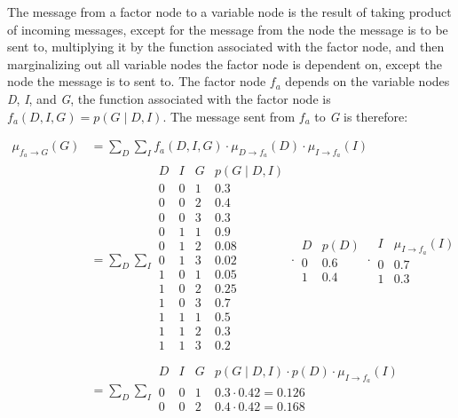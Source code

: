 \documentclass[a4paper, 12pt]{article}
\begin{document}
The message from a factor node to a variable node is the result of taking product of incoming messages, except for the message from the node the message is to be sent to, multiplying it by the function associated with the factor node, and then marginalizing out all variable nodes the factor node is dependent on, except the node the message is to sent to. The factor node $f_a$ depends on the variable nodes \textit{D}, \textit{I}, and \textit{G}, the function associated with the factor node is $f_a(D, I, G) = p(G \mid D, I)$. The message sent from $f_a$ to \textit{G} is therefore:

\begin{align}
	\mu_{f_a \to G}(G) &= \sum_D \sum_I f_a(D, I, G) \cdot \mu_{D \to f_a}(D) \cdot \mu_{I \to f_a}(I)\\
	&= \sum_D \sum_I \begin{array}{ccc|c}
		D & I & G & p(G \mid D, I)\\
		\hline
		0 & 0 & 1 & 0.3\\
		0 & 0 & 2 & 0.4\\
		0 & 0 & 3 & 0.3\\
		0 & 1 & 1 & 0.9\\
		0 & 1 & 2 & 0.08\\
		0 & 1 & 3 & 0.02\\
		1 & 0 & 1 & 0.05\\
		1 & 0 & 2 & 0.25\\
		1 & 0 & 3 & 0.7\\
		1 & 1 & 1 & 0.5\\
		1 & 1 & 2 & 0.3\\
		1 & 1 & 3 & 0.2\\
	\end{array} \cdot \begin{array}{c|c}
		D & p(D)\\
		\hline
		0 & 0.6\\
		1 & 0.4
	\end{array} \cdot \begin{array}{c|c}
		I & \mu_{I \to f_a}(I)\\
		\hline
		0 & 0.7\\
		1 & 0.3
	\end{array}\\
	&= \sum_D \sum_I \begin{array}{ccc|c}
		D & I & G & p(G \mid D, I) \cdot p(D) \cdot \mu_{I \to f_a}(I) \\
		\hline
		0 & 0 & 1 & 0.3 \cdot 0.42 = 0.126\\
		0 & 0 & 2 & 0.4 \cdot 0.42 = 0.168\\

\end{array}
\end{align}
\end{document}
